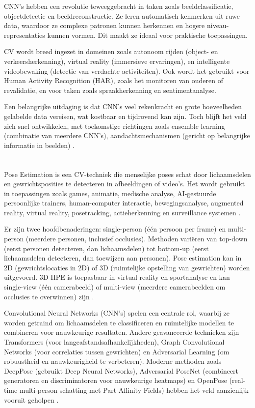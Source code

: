 CNN's hebben een revolutie teweeggebracht in taken zoals beeldclassificatie, objectdetectie en beeldreconstructie. 
Ze leren automatisch kenmerken uit ruwe data, waardoor ze complexe patronen kunnen herkennen en hogere niveau-representaties kunnen vormen. 
Dit maakt ze ideaal voor praktische toepassingen. 

CV wordt breed ingezet in domeinen zoals autonoom rijden (object- en verkeersherkenning), virtual reality (immersieve ervaringen), en intelligente videobewaking (detectie van verdachte activiteiten). 
Ook wordt het gebruikt voor Human Activity Recognition (HAR), zoals het monitoren van ouderen of revalidatie, en voor taken zoals spraakherkenning en sentimentanalyse. 

Een belangrijke uitdaging is dat CNN's veel rekenkracht en grote hoeveelheden gelabelde data vereisen, wat kostbaar en tijdrovend kan zijn. 
Toch blijft het veld zich snel ontwikkelen, met toekomstige richtingen zoals ensemble learning (combinatie van meerdere CNN's), aandachtsmechanismen (gericht op belangrijke informatie in beelden) \autocite{ZhaoEtAl2024}. 

\section{}%
\label{sec:pose-estimation}
 
Pose Estimation is een CV-techniek die menselijke poses schat door lichaamsdelen en gewrichtsposities te detecteren in afbeeldingen of video's. 
Het wordt gebruikt in toepassingen zoals games, animatie, medische analyse, AI-gestuurde persoonlijke trainers, human-computer interactie, bewegingsanalyse, augmented reality, virtual reality, posetracking, actieherkenning en surveillance systemen \autocite{SiddharthEtAl2021}.

Er zijn twee hoofdbenaderingen: single-person (één persoon per frame) en multi-person (meerdere personen, inclusief occlusies). 
Methoden variëren van top-down (eerst personen detecteren, dan lichaamsdelen) tot bottom-up (eerst lichaamsdelen detecteren, dan toewijzen aan personen). 
Pose estimation kan in 2D (gewrichtslocaties in 2D) of 3D (ruimtelijke opstelling van gewrichten) worden uitgevoerd. 
3D HPE is toepasbaar in virtual reality en sportanalyse en kan single-view (één camerabeeld) of multi-view (meerdere camerabeelden om occlusies te overwinnen) zijn \autocite{ZhengEtAl2023}.

Convolutional Neural Networks (CNN's) spelen een centrale rol, waarbij ze worden getraind om lichaamsdelen te classificeren en ruimtelijke modellen te combineren voor nauwkeurige resultaten. 
Andere geavanceerde technieken zijn Transformers (voor langeafstandsafhankelijkheden), Graph Convolutional Networks (voor correlaties tussen gewrichten) en Adversarial Learning (om robuustheid en nauwkeurigheid te verbeteren). 
Moderne methoden zoals DeepPose (gebruikt Deep Neural Networks), Adversarial PoseNet (combineert generatoren en discriminatoren voor nauwkeurige heatmaps) en OpenPose (real-time multi-person schatting met Part Affinity Fields) hebben het veld aanzienlijk vooruit geholpen \autocite{ZhaoEtAl2024}.

